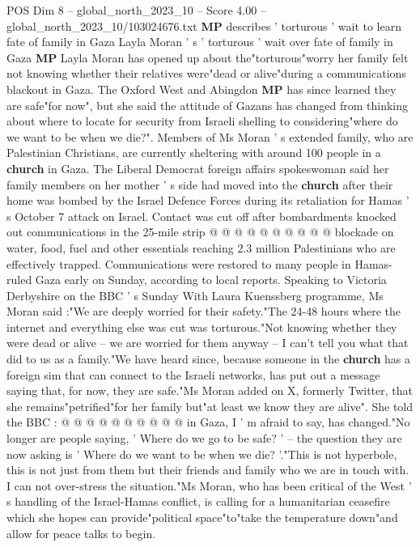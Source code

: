 \begin{textsample}{POS Dim 8 – global\_north\_2023\_10 – Score 4.00 – global\_north\_2023\_10/103024676.txt}  \label{ex:f8_pos_209}
\textbf{MP} describes ' torturous ' wait to learn fate of family in Gaza Layla Moran ' s ' torturous ' wait over fate of family in Gaza \textbf{MP} Layla Moran has opened up about the"torturous"worry her family felt not knowing whether their relatives were"dead or alive"during a communications blackout in Gaza.
The Oxford West and Abingdon \textbf{MP} has since learned they are safe"for now", but she said the attitude of Gazans has changed from thinking about where to locate for security from Israeli shelling to considering"where do we want to be when we die?".
Members of Ms Moran ' s extended family, who are Palestinian Christians, are currently sheltering with around 100 people in a \textbf{church} in Gaza.
The Liberal Democrat foreign affairs spokeswoman said her family members on her mother ' s side had moved into the \textbf{church} after their home was bombed by the Israel Defence Forces during its retaliation for Hamas ' s October 7 attack on Israel.
Contact was cut off after bombardments knocked out communications in the 25-mile strip @ @ @ @ @ @ @ @ @ @ blockade on water, food, fuel and other essentials reaching 2.3 million Palestinians who are effectively trapped.
Communications were restored to many people in Hamas-ruled Gaza early on Sunday, according to local reports.
Speaking to Victoria Derbyshire on the BBC ' s Sunday With Laura Kuenssberg programme, Ms Moran said :"We are deeply worried for their safety."The 24-48 hours where the internet and everything else was cut was torturous."Not knowing whether they were dead or alive -- we are worried for them anyway -- I can't tell you what that did to us as a family."We have heard since, because someone in the \textbf{church} has a foreign sim that can connect to the Israeli networks, has put out a message saying that, for now, they are safe."Ms Moran added on X, formerly Twitter, that she remains"petrified"for her family but"at least we know they are alive".
She told the BBC : @ @ @ @ @ @ @ @ @ @ in Gaza, I ' m afraid to say, has changed."No longer are people saying, ' Where do we go to be safe? ' -- the question they are now asking is ' Where do we want to be when we die? '."This is not hyperbole, this is not just from them but their friends and family who we are in touch with.
I can not over-stress the situation."Ms Moran, who has been critical of the West ' s handling of the Israel-Hamas conflict, is calling for a humanitarian ceasefire which she hopes can provide"political space"to"take the temperature down"and allow for peace talks to begin.

\end{textsample}
